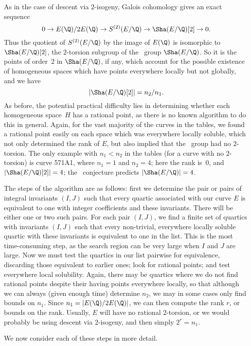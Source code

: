 As in the case of descent via $2$-isogeny, Galois cohomology gives an
exact sequence
$$
   0 \to E(\Q)/2E(\Q) \to S^{(2)}(E/\Q) \to \Sha(E/\Q)[2] \to 0.
$$
Thus the quotient of $S^{(2)}(E/\Q)$ by the image of $E(\Q)$ is
isomorphic to $\Sha(E/\Q)[2]$, the $2$-torsion subgroup of the \TS\
group $\Sha(E/\Q)$.  So it is the points of order~2 in $\Sha(E/\Q)$,
if any, which account for the possible existence of homogeneous spaces
which have points everywhere locally but not globally, and we have
$$
   \left|\Sha(E/\Q)[2]\right| = n_2/n_1.
$$
As before, the potential practical difficulty lies in determining
whether each homogeneous space~$H$ has a rational point, as there is
no known algorithm to do this in general.  Again, for the vast
majority of the curves in the tables, we found a rational
point easily on each space which was everywhere locally soluble, which
not only determined the rank of $E$, but also implied that the \TS\
group had no $2$-torsion.  The only example with $n_1<n_2$ in the
tables (for a curve with no $2$-torsion) is curve 571A1, where $n_1=1$
and $n_2=4$; here the rank is~$0$, and $\left|\Sha(E/\Q)[2]\right|=4$;
the \BSD\ conjecture predicts $\left|\Sha(E/\Q)\right|=4$.

The steps of the algorithm are as follows: first we determine the pair
or pairs of integral invariants $(I,J)$ such that every quartic
associated with our curve $E$ is equivalent to one with integer
coefficients and these invariants.  There will be either one or two
such pairs.  For each pair $(I,J)$, we find a finite set of quartics
with invariants $(I,J)$ such that every non-trivial, everywhere
locally soluble quartic with these invariants is equivalent to one in
the list.  This is the most time-consuming step, as the search region
can be very large when $I$ and $J$ are large.  Now we must test the
quartics in our list pairwise for equivalence, discarding those
equivalent to earlier ones; look for rational points; and test
everywhere local solubility.  Again, there may be quartics where we do
not find rational points despite their having points everywhere
locally, so that although we can always (given enough time) determine
$n_2$, we may in some cases only find bounds on $n_1$.  Since
$n_1=\left|E(\Q)/2E(\Q)\right|$, we can then compute the rank $r$, or
bounds on the rank.  Usually, $E$ will have no rational $2$-torsion,
or we would probably be using descent via $2$-isogeny, and then
simply $2^r=n_1$.

We now consider each of these steps in more detail.


